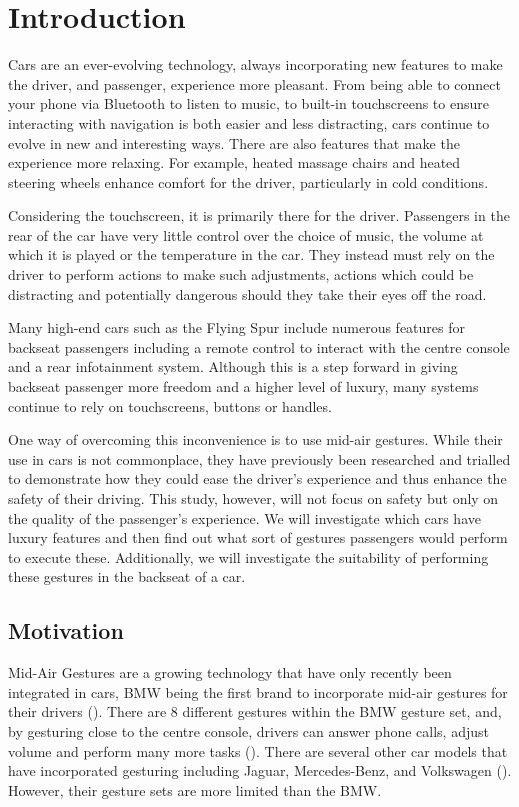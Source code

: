 \documentclass{l4proj}
\begin{document}
\chapter{Introduction}


Cars are an ever-evolving technology, always incorporating new features to make the driver, and passenger, experience more pleasant. From being able to connect your phone via Bluetooth to listen to music, to built-in touchscreens to ensure interacting with navigation is both easier and less distracting, cars continue to evolve in new and interesting ways. There are also features that make the experience more relaxing. For example, heated massage chairs and heated steering wheels enhance comfort for the driver, particularly in cold conditions.

Considering the touchscreen, it is primarily there for the driver. Passengers in the rear of the car have very little control over the choice of music, the volume at which it is played or the temperature in the car. They instead must rely on the driver to perform actions to make such adjustments, actions which could be distracting and potentially dangerous should they take their eyes off the road. 

Many high-end cars such as the \cite{Bentley_2021} Flying Spur include numerous features for backseat passengers including a remote control to interact with the centre console and a rear infotainment system. Although this is a step forward in giving backseat passenger more freedom and a higher level of luxury, many systems continue to rely on touchscreens, buttons or handles.

One way of overcoming this inconvenience is to use mid-air gestures. While their use in cars is not commonplace, they have previously been researched and trialled to demonstrate how they could ease the driver's experience and thus enhance the safety of their driving. This study, however, will not focus on safety but only on the quality of the passenger's experience. We will investigate which cars have luxury features and then find out what sort of gestures passengers would perform to execute these. Additionally, we will investigate the suitability of performing these gestures in the backseat of a car.

\section{Motivation}
Mid-Air Gestures are a growing technology that have only recently been integrated in cars, BMW being the first brand to incorporate mid-air gestures for their drivers (\cite{Dow_2017}). There are 8 different gestures within the BMW gesture set, and, by gesturing close to the centre console, drivers can answer phone calls, adjust volume and perform many more tasks (\cite{Rommel_2020}). There are several other car models that have incorporated gesturing including Jaguar, Mercedes-Benz, and Volkswagen (\cite{Dow_2017}). However, their gesture sets are more limited than the BMW.
\end{document}
